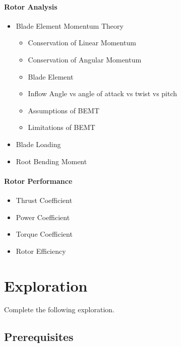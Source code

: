 \documentclass[11pt,twocolumn]{article}
\begin{document}
\paragraph{Rotor Analysis}
\begin{itemize}
	\item Blade Element Momentum Theory
	\begin{itemize}
		\item Conservation of Linear Momentum
		\item Conservation of Angular Momentum
		\item Blade Element
		\item Inflow Angle vs angle of attack vs twist vs pitch
		\item Assumptions of BEMT
		\item Limitations of BEMT
	\end{itemize}
	\item Blade Loading
	\item Root Bending Moment
\end{itemize}

\paragraph{Rotor Performance}
\begin{itemize}
	\item Thrust Coefficient
	\item Power Coefficient
	\item Torque Coefficient
	\item Rotor Efficiency
\end{itemize}



\newpage
\section{Exploration}
\label{sec:exploration}

Complete the following exploration.

\subsection{Prerequisites}
\label{ssec:prereqs}
\end{document}
